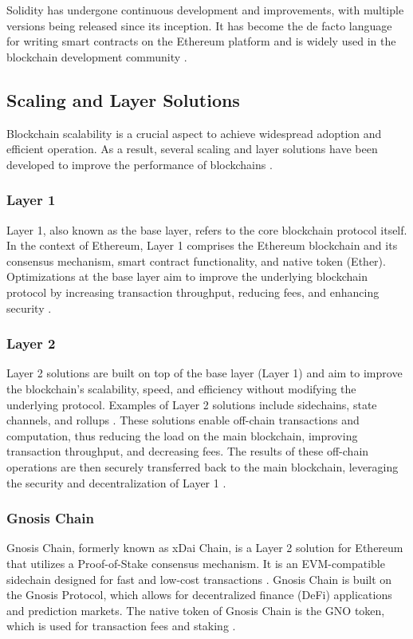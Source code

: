 Solidity has undergone continuous development and improvements, with multiple versions being released since its inception. It has become the de facto language for writing smart contracts on the Ethereum platform and is widely used in the blockchain development community \cite{antonopoulos2018mastering}.

\subsection{Scaling and Layer Solutions}
Blockchain scalability is a crucial aspect to achieve widespread adoption and efficient operation. As a result, several scaling and layer solutions have been developed to improve the performance of blockchains \cite{pisa2019state, buterin2018layer2}.

\subsubsection{Layer 1}
Layer 1, also known as the base layer, refers to the core blockchain protocol itself. In the context of Ethereum, Layer 1 comprises the Ethereum blockchain and its consensus mechanism, smart contract functionality, and native token (Ether). Optimizations at the base layer aim to improve the underlying blockchain protocol by increasing transaction throughput, reducing fees, and enhancing security \cite{wood2014ethereum}.

\subsubsection{Layer 2}
Layer 2 solutions are built on top of the base layer (Layer 1) and aim to improve the blockchain's scalability, speed, and efficiency without modifying the underlying protocol. Examples of Layer 2 solutions include sidechains, state channels, and rollups \cite{buterin2018layer2}. These solutions enable off-chain transactions and computation, thus reducing the load on the main blockchain, improving transaction throughput, and decreasing fees. The results of these off-chain operations are then securely transferred back to the main blockchain, leveraging the security and decentralization of Layer 1 \cite{pisa2019state}.

\subsubsection{Gnosis Chain}
Gnosis Chain, formerly known as xDai Chain, is a Layer 2 solution for Ethereum that utilizes a Proof-of-Stake consensus mechanism. It is an EVM-compatible sidechain designed for fast and low-cost transactions \cite{gnosischain}. Gnosis Chain is built on the Gnosis Protocol, which allows for decentralized finance (DeFi) applications and prediction markets. The native token of Gnosis Chain is the GNO token, which is used for transaction fees and staking \cite{gnosischain}.

